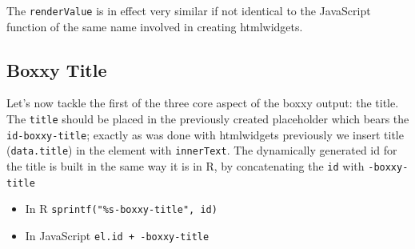 \documentclass[
]{krantz}
\makeatletter
\newenvironment{Shaded}{\begin{snugshade}}{\end{snugshade}}
\newcommand{\AttributeTok}[1]{\textcolor[rgb]{0.61,0.61,0.61}{#1}}
\newcommand{\CommentTok}[1]{\textcolor[rgb]{0.37,0.37,0.37}{\textit{#1}}}
\newcommand{\ControlFlowTok}[1]{\textcolor[rgb]{0.27,0.27,0.27}{\textbf{#1}}}
\newcommand{\DataTypeTok}[1]{\textcolor[rgb]{0.27,0.27,0.27}{#1}}
\newcommand{\KeywordTok}[1]{\textcolor[rgb]{0.27,0.27,0.27}{\textbf{#1}}}
\newcommand{\NormalTok}[1]{#1}
\newcommand{\OperatorTok}[1]{\textcolor[rgb]{0.43,0.43,0.43}{\textbf{#1}}}
\newcommand{\StringTok}[1]{\textcolor[rgb]{0.5,0.5,0.5}{#1}}
\newcommand{\VariableTok}[1]{\textcolor[rgb]{0,0,0}{#1}}
\providecommand{\tightlist}{%
  \setlength{\itemsep}{0pt}\setlength{\parskip}{0pt}}
\newenvironment{kframe}{%
\medskip{}
\setlength{\fboxsep}{.8em}
 \def\at@end@of@kframe{}%
 \ifinner\ifhmode%
  \def\at@end@of@kframe{\end{minipage}}%
  \begin{minipage}{\columnwidth}%
 \fi\fi%
 \def\FrameCommand##1{\hskip\@totalleftmargin \hskip-\fboxsep
 \colorbox{shadecolor}{##1}\hskip-\fboxsep
     \hskip-\linewidth \hskip-\@totalleftmargin \hskip\columnwidth}%
 \MakeFramed {\advance\hsize-\width
   \@totalleftmargin\z@ \linewidth\hsize
   \@setminipage}}%
 {\par\unskip\endMakeFramed%
 \at@end@of@kframe}
\renewenvironment{Shaded}{\begin{kframe}}{\end{kframe}}
\newenvironment{rmdblock}[1]
  {
  \begin{itemize}
  \renewcommand{\labelitemi}{
    \raisebox{-.7\height}[0pt][0pt]{
      {\setkeys{Gin}{width=3em,keepaspectratio}\texttt{[image: images/\#1]}}
    }
  }
  \setlength{\fboxsep}{1em}
  \begin{kframe}
  \item
  }
  {
  \end{kframe}
  \end{itemize}
  }
\newenvironment{rmdnote}
  {\begin{rmdblock}{note}}
  {\end{rmdblock}}
\makeatother
\begin{document}
\begin{rmdnote}
The \texttt{renderValue} is in effect very similar if not identical to
the JavaScript function of the same name involved in creating
htmlwidgets.
\end{rmdnote}

\hypertarget{shiny-output-boxxy-title}{%
\subsection{Boxxy Title}\label{shiny-output-boxxy-title}}

Let's now tackle the first of the three core aspect of the boxxy output: the title. The \texttt{title} should be placed in the previously created placeholder which bears the \texttt{id-boxxy-title}; exactly as was done with htmlwidgets previously we insert title (\texttt{data.title}) in the element with \texttt{innerText}. The dynamically generated id for the title is built in the same way it is in R, by concatenating the \texttt{id} with \texttt{-boxxy-title}

\begin{itemize}
\tightlist
\item
  In R \texttt{sprintf("\%s-boxxy-title",\ id)}
\item
  In JavaScript \texttt{el.id\ +\ \textquotesingle{}-boxxy-title\textquotesingle{}}
\end{itemize}

\begin{Shaded}
\end{Shaded}
\end{document}
